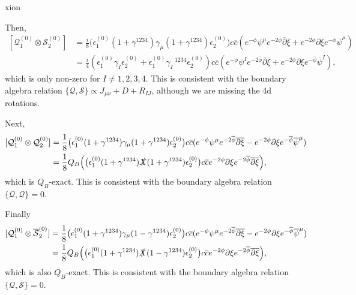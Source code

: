 xion\documentclass[12pt]{article}
\def\ie{\begin{equation}\begin{aligned}}
\def\fe{\end{aligned}\end{equation}}
\numberwithin{equation}{section}
\newcommand{\B}[1]{\overline{#1}}
\begin{document}
Then,
\ie
    [\mathcal{Q}^{(0)}_1\otimes\mathcal{S}^{(0)}_2]&=\frac{i}{8}\big(\epsilon^{(0)}_1(1+\gamma^{1234})\gamma_{\mu}(1+\gamma^{1234})\epsilon_2^{(0)}\big)c\B{c}(e^{-\phi}\psi^{\mu}e^{-2\B{\phi}}\B{\partial}\B{\xi}+e^{-2\phi}\partial\xi e^{-\B{\phi}}\B{\psi}^{\mu})\\
    &=\frac{i}{4}(\epsilon_1^{(0)}\gamma_I\epsilon_2^{(0)}+\epsilon_1^{(0)}\gamma_I\,^{1234}\epsilon_2^{(0)})c\B{c}(e^{-\phi}\psi^{I}e^{-2\B{\phi}}\B{\partial}\B{\xi}+e^{-2\phi}\partial\xi e^{-\B{\phi}}\B{\psi}^{I}),
\fe
which is only non-zero for $I\neq1,2,3,4$. This is consistent with the boundary algebra relation $\{\mathcal{Q},\mathcal{S}\}\propto J_{\mu\nu}+D+R_{IJ}$, although we are missing the 4d rotations.

Next,
\ie
    [\mathcal{Q}^{(0)}_1\otimes\mathcal{Q}^{(0)}_2]&=\frac{1}{8}\big(\epsilon^{(0)}_1(1+\gamma^{1234})\gamma_{\mu}(1+\gamma^{1234})\epsilon_2^{(0)}\big)c\B{c}(e^{-\phi}\psi^{\mu}e^{-2\B{\phi}}\B{\partial}\B{\xi}-e^{-2\phi}\partial\xi e^{-\B{\phi}}\B{\psi}^{\mu})\\
    &=\frac{1}{8}Q_B\Big(\big(\epsilon^{(0)}_1(1+\gamma^{1234})\slashed{X}(1+\gamma^{1234})\epsilon_2^{(0)}\big)c\B{c}e^{-2\phi}\partial\xi e^{-2\B{\phi}}\B{\partial}\B{\xi}\Big),
\fe
which is $Q_B$-exact. This is consistent with the boundary algebra relation $\{\mathcal{Q},\mathcal{Q}\}=0$.

Finally
\ie
    [\mathcal{Q}^{(0)}_1\otimes\B{\mathcal{S}}^{(0)}_2]&=\frac{1}{8}\big(\epsilon^{(0)}_1(1+\gamma^{1234})\gamma_{\mu}(1-\gamma^{1234})\epsilon_2^{(0)}\big)c\B{c}(e^{-\phi}\psi^{\mu}e^{-2\B{\phi}}\B{\partial}\B{\xi}-e^{-2\phi}\partial\xi e^{-\B{\phi}}\B{\psi}^{\mu})\\
    &=\frac{1}{8}Q_B\Big(\big(\epsilon^{(0)}_1(1+\gamma^{1234})\slashed{X}(1-\gamma^{1234})\epsilon_2^{(0)}\big)c\B{c}e^{-2\phi}\partial\xi e^{-2\B{\phi}}\B{\partial}\B{\xi}\Big),
\fe
which is also $Q_B$-exact. This is consistent with the boundary algebra relation $\{\mathcal{Q},\B{\mathcal{S}}\}=0$.
\end{document}
